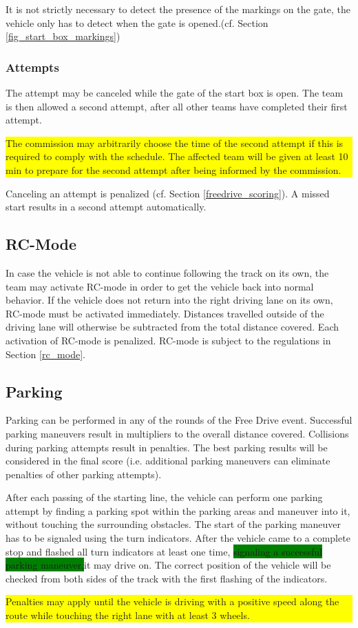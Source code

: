 It is not strictly necessary to detect the presence of the markings on the
gate, the vehicle only has to detect when the gate is opened.(cf. Section
\ref{fig_start_box_markings})

\subsubsection{Attempts}

The attempt may be canceled while the gate of the start box is open. The team
is then allowed a second attempt, after all other teams have completed their
first attempt.\\ \colorbox{yellow}{\parbox{\colorboxwidth}{The commission may
		arbitrarily choose the time of the second attempt if this is required to comply
		with the schedule. The affected team will be given at least 10 min to prepare
		for the second attempt after being informed by the commission.}} Canceling an
attempt is penalized (cf. Section \ref{freedrive_scoring}). A missed start
results in a second attempt automatically.

\subsection{RC-Mode}

In case the vehicle is not able to continue following the track on its own, the
team may activate RC-mode in order to get the vehicle back into normal
behavior. If the vehicle does not return into the right driving lane on its
own, RC-mode must be activated immediately. Distances travelled outside of the
driving lane will otherwise be subtracted from the total distance covered. Each
activation of RC-mode is penalized. RC-mode is subject to the regulations in
Section \ref{rc_mode}.

\subsection{Parking}

Parking can be performed in any of the rounds of the Free Drive event.
Successful parking maneuvers result in multipliers to the overall distance
covered. Collisions during parking attempts result in penalties. The best
parking results will be considered in the final score (i.e. additional parking
maneuvers can eliminate penalties of other parking attempts).

After each passing of the starting line, the vehicle can perform one parking
attempt by finding a parking spot within the parking areas and maneuver into
it, without touching the surrounding obstacles. The start of the parking
maneuver has to be signaled using the turn indicators. After the vehicle came
to a complete stop and flashed all turn indicators at least one time,
\colorbox{green}{signaling a successful parking maneuver,}it may drive on. The
correct position of the vehicle will be checked from both sides of the track
with the first flashing of the indicators.
	{\colorbox{yellow}{\parbox{\colorboxwidth}{Penalties may apply until the
				vehicle is driving with a positive speed along the route while touching the
				right lane with at least 3 wheels.}}}

